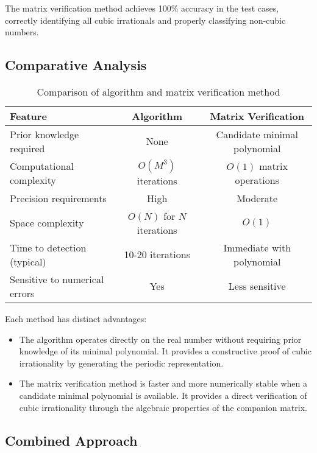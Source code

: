 The matrix verification method achieves 100\% accuracy in the test cases, correctly identifying all cubic irrationals and properly classifying non-cubic numbers.

\subsection{Comparative Analysis}

\begin{table}[htbp]
\centering
\begin{tabular}{|l|c|c|}
\hline
\textbf{Feature} & \textbf{\HAPD{} Algorithm} & \textbf{Matrix Verification} \\
\hline
Prior knowledge required & None & Candidate minimal polynomial \\
\hline
Computational complexity & $O(M^3)$ iterations & $O(1)$ matrix operations \\
\hline
Precision requirements & High & Moderate \\
\hline
Space complexity & $O(N)$ for $N$ iterations & $O(1)$ \\
\hline
Time to detection (typical) & 10-20 iterations & Immediate with polynomial \\
\hline
Sensitive to numerical errors & Yes & Less sensitive \\
\hline
\end{tabular}
\caption{Comparison of \HAPD{} algorithm and matrix verification method}
\label{tab:method_comparison}
\end{table}

Each method has distinct advantages:

\begin{itemize}
\item The \HAPD{} algorithm operates directly on the real number without requiring prior knowledge of its minimal polynomial. It provides a constructive proof of cubic irrationality by generating the periodic representation.

\item The matrix verification method is faster and more numerically stable when a candidate minimal polynomial is available. It provides a direct verification of cubic irrationality through the algebraic properties of the companion matrix.
\end{itemize}

\subsection{Combined Approach}

